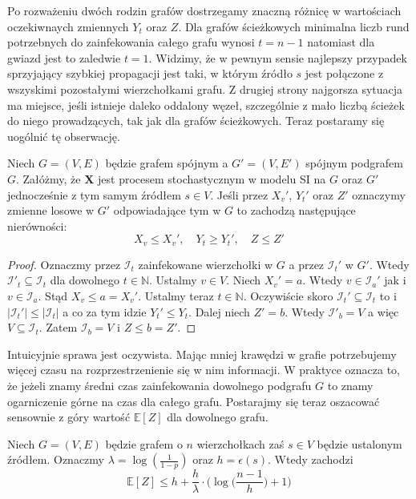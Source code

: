 Po rozważeniu dwóch rodzin grafów dostrzegamy znaczną różnicę w wartościach oczekiwnaych zmiennych $Y_t$ oraz $Z$. Dla grafów ścieżkowych minimalna liczb rund potrzebnych do zainfekowania całego grafu wynosi $t=n-1$ natomiast dla gwiazd jest to zaledwie $t=1$. Widzimy, że w pewnym sensie najlepszy przypadek sprzyjający szybkiej propagacji jest taki, w którym źródło $s$ jest połączone z wszyskimi pozostałymi wierzchołkami grafu. Z drugiej strony najgorsza sytuacja ma miejsce, jeśli istnieje daleko oddalony węzeł, szczególnie z mało liczbą ścieżek do niego prowadzących, tak jak dla grafów ścieżkowych. Teraz postaramy się uogólnić tę obserwację. 

\begin{theorem}\label{theorem:montonicity_of_total_infection}
Niech $G=(V,E)$ będzie grafem spójnym a $G'=(V,E')$ spójnym podgrafem $G$. Załóżmy, że $\mathbf{X}$ jest procesem stochastycznym w modelu SI na $G$ oraz $G'$ jednocześnie z tym samym źródłem $s\in V$. Jeśli przez $X_v'$, $Y_t'$ oraz $Z'$ oznaczymy zmienne losowe w $G'$ odpowiadające tym w  $G$ to zachodzą następujące nierówności:
\[
    X_v \le X_v', \quad Y_t \ge Y_t', \quad Z\le Z'
\] 
\end{theorem}
\begin{proof}
Oznaczmy przez $\mathcal{I}_t$ zainfekowane wierzchołki w $G$ a przez $\mathcal{I}_t'$ w $G'$. Wtedy $\mathcal{I}'_t\subseteq\mathcal{I}_t$ dla dowolnego $t\in\mathbb{N}$. Ustalmy $v\in V$. Niech $X_v'=a$. Wtedy $v\in\mathcal{I}_a'$ jak i $v\in\mathcal{I}_a$. Stąd $X_v\le a=X_v'$. Ustalmy teraz $t\in\mathbb{N}$. Oczywiście skoro $\mathcal{I}_t'\subseteq\mathcal{I}_t$ to i $|\mathcal{I}_t'|\le|\mathcal{I}_t|$ a co za tym idzie $Y_t'\le Y_t$. Dalej niech $Z' = b$. Wtedy $\mathcal{I}'_b =V$ a więc $V\subseteq \mathcal{I}_t$. Zatem $\mathcal{I}_b = V$ i $Z\le b=Z'$. 
\end{proof}

Intuicyjnie sprawa jest oczywista. Mając mniej krawędzi w grafie potrzebujemy więcej czasu na rozprzestrzenienie się w nim informacji. W praktyce oznacza to, że jeżeli znamy średni czas zainfekowania dowolnego podgrafu $G$ to znamy ogarniczenie górne na czas dla całego grafu. Postarajmy się teraz oszacować sensownie z góry wartość $\mathbb{E}[Z]$ dla dowolnego grafu.

\begin{theorem}\label{theorem:upper_bound_on_EZ}
Niech $G=(V,E)$ będzie grafem o $n$ wierzchołkach zaś $s\in V$ będzie ustalonym źródłem. Oznaczmy $\lambda=\log(\frac{1}{1-p})$ oraz $h = \epsilon(s)$. Wtedy zachodzi
\[
    \mathbb{E}[Z] \le h  + \frac{h}{\lambda} \cdot \Big(\log\Big(\frac{n-1}{h}\Big) + 1\Big)
\]
\end{theorem}

